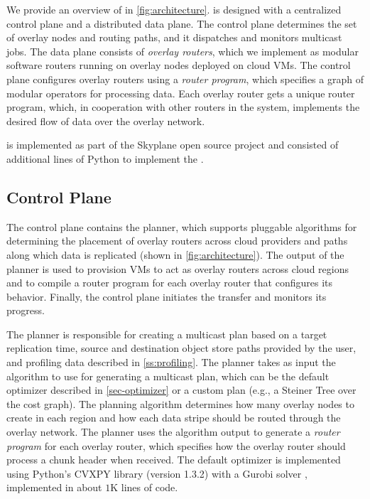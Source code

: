 We provide an overview of \sys{} in \cref{fig:architecture}. \sys{} is designed with a centralized control plane and a distributed data plane. The control plane determines the set of overlay nodes and routing paths, and it dispatches and monitors multicast jobs. The data plane consists of \textit{overlay routers}, which we implement as modular software routers running on overlay nodes deployed on cloud VMs.  The control plane configures overlay routers using a \textit{router program}, which specifies a graph of modular operators for processing data.
Each overlay router gets a unique router program, which, in cooperation with other routers in the system, implements the desired flow of data over the overlay network.

\sys is implemented as part of the Skyplane \cite{jain2022skyplane} open source project and consisted of  additional lines of Python to implement the .


\subsection{Control Plane}
The control plane contains the planner, which supports pluggable algorithms for determining the placement of overlay routers across cloud providers and paths along which data is replicated (shown in \cref{fig:architecture}).
The output of the planner is used to provision VMs to act as overlay routers across cloud regions and to compile a router program for each overlay router that configures its behavior.
Finally, the control plane initiates the transfer and monitors its progress. 

The planner is responsible for creating a multicast plan based on a target replication time, source and destination object store paths provided by the user, and profiling data described in \cref{ss:profiling}.  
The planner takes as input the algorithm to use for generating a multicast plan, which can be the default \sys{} optimizer described in \cref{sec-optimizer} or a custom plan (e.g., a Steiner Tree over the cost graph). The planning algorithm determines how many overlay nodes to create in each region and how each data stripe should be routed through the overlay network. The planner uses the algorithm output to generate a \textit{router program} for each overlay router, which specifies how the overlay router should process a chunk header when received. 
The \sys{} default optimizer is implemented using Python's CVXPY library \cite{cvxpy} (version 1.3.2) with a Gurobi solver \cite{gurobi}, implemented in about $1$K lines of code.  

